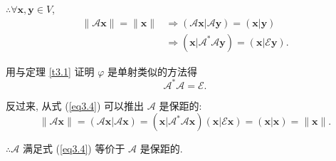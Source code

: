 \documentclass{ctexart}
\begin{document}
$\therefore\forall\boldsymbol{x},\boldsymbol{y}\in V$,
\begin{align*}
    \|\mathcal{A}\boldsymbol{x}\|=\|\boldsymbol{x}\| & \Rightarrow(\mathcal{A}\boldsymbol{x}|\mathcal{A}\boldsymbol{y})=(\boldsymbol{x}|\boldsymbol{y}) \\
    & \Rightarrow(\boldsymbol{x}|\mathcal{A}^*\mathcal{A}\boldsymbol{y})=(\boldsymbol{x}|\mathcal{E}\boldsymbol{y}).
\end{align*}

用与定理 \ref{t3.1} 证明 $\varphi$ 是单射类似的方法得
\begin{equation}\label{eq3.4}
    \mathcal{A}^*\mathcal{A}=\mathcal{E}.
\end{equation}

反过来, 从式 (\ref{eq3.4}) 可以推出 $\mathcal{A}$ 是保距的:
\[\|\mathcal{A}\boldsymbol{x}\|=(\mathcal{A}\boldsymbol{x}|\mathcal{A}\boldsymbol{x})=(\boldsymbol{x}|\mathcal{A}^*\mathcal{A}\boldsymbol{x})(\boldsymbol{x}|\mathcal{E}\boldsymbol{x})=(\boldsymbol{x}|\boldsymbol{x})=\|\boldsymbol{x}\|.\]

$\therefore\mathcal{A}$ 满足式 (\ref{eq3.4}) 等价于 $\mathcal{A}$ 是保距的.
\end{document}
